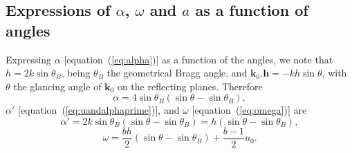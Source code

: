\documentclass[preprint]{iucr}              %
\begin{document}
\subsection{Expressions of  $\alpha$, $\omega$ and $a$ as a function of angles}
\label{sec:physical_meaning}
Expressing $\alpha$ [equation~(\ref{eq:alpha})] as a function of the angles, we note that $h=2k \sin\theta_B$, being $\theta_B$ the geometrical Bragg angle, and $\textbf{k}_0 . \textbf{h}= -k h \sin\theta$, with $\theta$ the glancing angle of $\textbf{k}_0$ on the reflecting planes. Therefore
\begin{equation}\label{eq:alphavsangles}
    \alpha=4\sin\theta_B (\sin\theta-\sin\theta_B),
\end{equation}
$\alpha'$ [equation~(\ref{eq:uandalphaprime})], and $\omega$ [equation~(\ref{eq:omega})] are
\begin{equation}\label{eq:alphaprimevsangles}
    \alpha'=2 k \sin\theta_B(\sin\theta-\sin\theta_B)=h(\sin\theta-\sin\theta_B),
\end{equation}
\begin{equation}\label{eq:omegavsangles}
    \omega=\frac{b h}{2} (\sin\theta-\sin\theta_B) + \frac{b-1}{2} u_0.
\end{equation}
\end{document}

